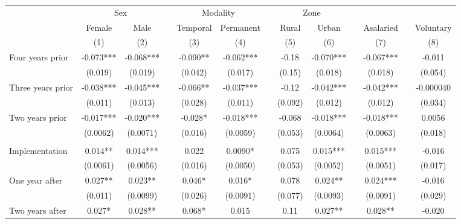 \begin{tabular}{lcccccccccccc}
\toprule
      & \multicolumn{2}{c}{Sex} &       & \multicolumn{2}{c}{Modality} &       & \multicolumn{2}{c}{Zone} &       &       &       &  \\
\cmidrule{2-3}\cmidrule{5-6}\cmidrule{8-9}      & Female & Male  &       & Temporal & Permanent &       & Rural  & Urban &       & Asalaried &       & Voluntary \\
\midrule
      & (1)   & (2)   &       & (3)   & (4)   &       & (5)   & (6)   &       & (7)   &       & (8) \\
\midrule
\midrule
Four years prior & -0.073*** & -0.068*** &       & -0.090** & -0.062*** &       & -0.18 & -0.070*** &       & -0.067*** &       & -0.011 \\
      & (0.019) & (0.019) &       & (0.042) & (0.017) &       & (0.15) & (0.018) &       & (0.018) &       & (0.054) \\
Three years prior & -0.038*** & -0.045*** &       & -0.066** & -0.037*** &       & -0.12 & -0.042*** &       & -0.042*** &       & -0.000040 \\
      & (0.011) & (0.013) &       & (0.028) & (0.011) &       & (0.092) & (0.012) &       & (0.012) &       & (0.034) \\
Two years prior & -0.017*** & -0.020*** &       & -0.028* & -0.018*** &       & -0.068 & -0.018*** &       & -0.018*** &       & 0.0056 \\
      & (0.0062) & (0.0071) &       & (0.016) & (0.0059) &       & (0.053) & (0.0064) &       & (0.0063) &       & (0.018) \\
      &       &       &       &       &       &       &       &       &       &       &       &  \\
Implementation & 0.014** & 0.014*** &       & 0.022 & 0.0090* &       & 0.075 & 0.015*** &       & 0.015*** &       & -0.016 \\
      & (0.0061) & (0.0056) &       & (0.016) & (0.0050) &       & (0.053) & (0.0052) &       & (0.0051) &       & (0.017) \\
One year after & 0.027** & 0.023** &       & 0.046* & 0.016* &       & 0.078 & 0.024** &       & 0.024*** &       & -0.016 \\
      & (0.011) & (0.0099) &       & (0.026) & (0.0091) &       & (0.077) & (0.0093) &       & (0.0091) &       & (0.029) \\
Two years after & 0.027* & 0.028** &       & 0.068* & 0.015 &       & 0.11  & 0.027** &       & 0.028** &       & -0.020 \\

\end{tabular}
